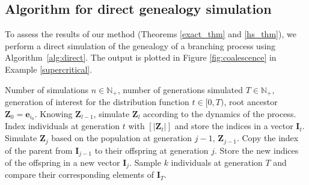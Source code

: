 \documentclass[preprint,3p,12pt]{elsarticle}
\theoremstyle{definition}
\begin{document}
\subsection{Algorithm for direct genealogy simulation}\label{genealogy_simulation}
To assess the results of our method (Theorems \ref{exact_thm} and \ref{hs_thm}), we perform a direct simulation of the genealogy of a branching process using Algorithm~\ref{alg:direct}. The output is plotted in Figure \ref{fig:coalescence} in Example \ref{supercritical}.
\begin{algorithm}
\caption{Direct simulation of genealogy}
\label{alg:direct}
\begin{algorithmic}[1]
\REQUIRE Number of simulations $n \in \mathbb{N}_+$, number of generations simulated $T \in \mathbb{N}_+$, generation of interest for the distribution function $t \in [0, T)$, root ancestor $\boldsymbol{Z}_0 = \boldsymbol{e}_{i_0}$.
    \STATE Knowing $\boldsymbol{Z}_{l-1}$, simulate $\boldsymbol{Z}_l$ according to the dynamics of the process.
\ENDFOR
    \STATE Index individuals at generation $t$ with $[|\boldsymbol{Z}_t|]$ and store the indices in a vector $\boldsymbol{I}_t$.
        \STATE Simulate $\boldsymbol{Z}_j$ based on the population at generation $j-1$, $\boldsymbol{Z}_{j-1}$. Copy the index of the parent from $\boldsymbol{I}_{j-1}$ to their offspring at generation $j$. Store the new indices of the offspring in a new vector $\boldsymbol{I}_{j}$. 
    \ENDFOR
    \STATE Sample $k$ individuals at generation $T$ and compare their corresponding elements of $\boldsymbol{I}_T$.
\ENDFOR
\end{algorithmic}
\end{algorithm}


\end{document}
